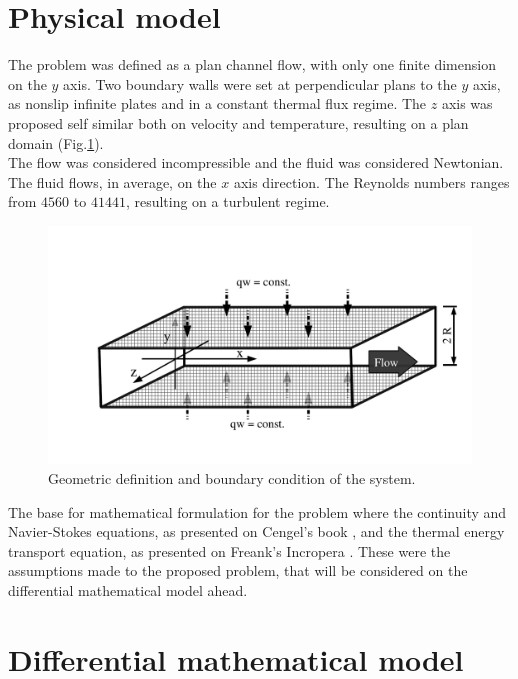 \documentclass[10pt]{article} %
\begin{document}
\section{Physical model}

The problem was defined as a plan channel flow, with only one finite dimension on the $y$ axis. Two boundary walls were set at perpendicular plans to the $y$ axis, as nonslip infinite plates and in a constant thermal flux regime. The $z$ axis was proposed self similar both on velocity and temperature, resulting on a plan domain (Fig.\ref{figure.1}). \\
The flow was considered incompressible and the fluid was considered Newtonian. The fluid flows, in average, on the $x$ axis direction. 
The Reynolds numbers ranges from $4560$ to $41441$, resulting on a turbulent regime. 

\begin{figure}[h!]
	\centering
	\includegraphics[angle=0, trim={0mm 10mm 0mm 20mm}, clip , scale=0.40]{fotos_formatacao_final/canal1}
	\caption{Geometric definition and boundary condition of the system.}
	\label{figure.1}
\end{figure}

The base for mathematical formulation for the problem where the continuity and Navier-Stokes equations, as presented on Cengel's book \cite{Cengel}, and the thermal energy transport equation, as presented on Freank's Incropera \cite{Incropera}. These were the assumptions made to the proposed problem, that will be considered on the differential mathematical model ahead.





\section{Differential mathematical model}
\end{document}
